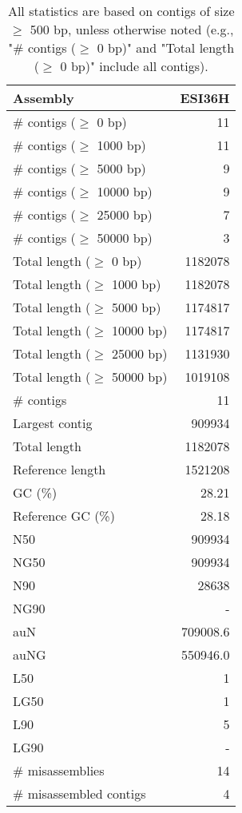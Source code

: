 \documentclass[12pt,a4paper]{article}
\begin{document}
\begin{table}[ht]
\begin{center}
\caption{All statistics are based on contigs of size $\geq$ 500 bp, unless otherwise noted (e.g., "\# contigs ($\geq$ 0 bp)" and "Total length ($\geq$ 0 bp)" include all contigs).}
\begin{tabular}{|l*{1}{|r}|}
\hline
Assembly & ESI36H \\ \hline
\# contigs ($\geq$ 0 bp) & 11 \\ \hline
\# contigs ($\geq$ 1000 bp) & 11 \\ \hline
\# contigs ($\geq$ 5000 bp) & 9 \\ \hline
\# contigs ($\geq$ 10000 bp) & 9 \\ \hline
\# contigs ($\geq$ 25000 bp) & 7 \\ \hline
\# contigs ($\geq$ 50000 bp) & 3 \\ \hline
Total length ($\geq$ 0 bp) & 1182078 \\ \hline
Total length ($\geq$ 1000 bp) & 1182078 \\ \hline
Total length ($\geq$ 5000 bp) & 1174817 \\ \hline
Total length ($\geq$ 10000 bp) & 1174817 \\ \hline
Total length ($\geq$ 25000 bp) & 1131930 \\ \hline
Total length ($\geq$ 50000 bp) & 1019108 \\ \hline
\# contigs & 11 \\ \hline
Largest contig & 909934 \\ \hline
Total length & 1182078 \\ \hline
Reference length & 1521208 \\ \hline
GC (\%) & 28.21 \\ \hline
Reference GC (\%) & 28.18 \\ \hline
N50 & 909934 \\ \hline
NG50 & 909934 \\ \hline
N90 & 28638 \\ \hline
NG90 & - \\ \hline
auN & 709008.6 \\ \hline
auNG & 550946.0 \\ \hline
L50 & 1 \\ \hline
LG50 & 1 \\ \hline
L90 & 5 \\ \hline
LG90 & - \\ \hline
\# misassemblies & 14 \\ \hline
\# misassembled contigs & 4 \\ \hline

\end{tabular}
\end{center}
\end{table}
\end{document}
